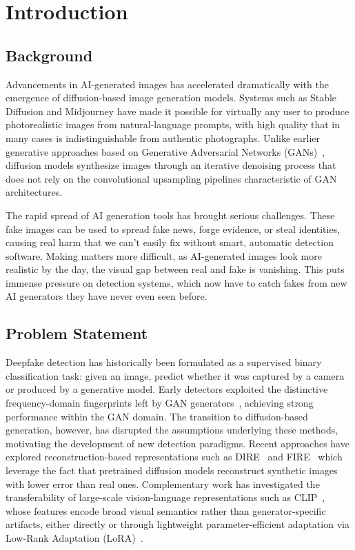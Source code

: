 \section{Introduction}
\label{sec:introduction}

\subsection{Background}
\label{subsec:background}
Advancements  in AI-generated images has accelerated  dramatically with the emergence of diffusion-based image generation models. Systems such as Stable Diffusion and Midjourney have made it possible for virtually any user to produce photorealistic images from natural-language prompts, with high quality that in many cases is indistinguishable from authentic photographs. Unlike earlier generative approaches based on Generative Adversarial Networks (GANs)~\cite{goodfellow2014gan}, diffusion models synthesize images through an iterative denoising process that does not rely on the convolutional upsampling pipelines characteristic of GAN architectures.

The rapid spread of AI generation tools has brought serious challenges. These fake images can be used to spread fake news, forge evidence, or steal identities, causing real harm that we can't easily fix without smart, automatic detection software. Making matters more difficult, as AI-generated images look more realistic by the day, the visual gap between real and fake is vanishing. This puts immense pressure on detection systems, which now have to catch fakes from new AI generators they have never even seen before.

\subsection{Problem Statement}
\label{subsec:problem-statement}

Deepfake detection has historically been formulated as a supervised binary classification task: given an image, predict whether it was captured by a camera or produced by a generative model. Early detectors exploited the distinctive frequency-domain fingerprints left by GAN generators~\cite{goodfellow2014gan}, achieving strong performance within the GAN domain. The transition to diffusion-based generation, however, has disrupted the assumptions underlying these methods, motivating the development of new detection paradigms. Recent approaches have explored reconstruction-based representations such as DIRE~\cite{wang2023dire} and FIRE~\cite{chen2025fire} which leverage the fact that pretrained diffusion models reconstruct synthetic images with lower error than real ones. Complementary work has investigated the transferability of large-scale vision-language representations such as CLIP~\cite{radford2021clip}, whose features encode broad visual semantics rather than generator-specific artifacts, either directly or through lightweight parameter-efficient adaptation via Low-Rank Adaptation (LoRA)~\cite{hu2022lora,cappelletti2024lora}.

